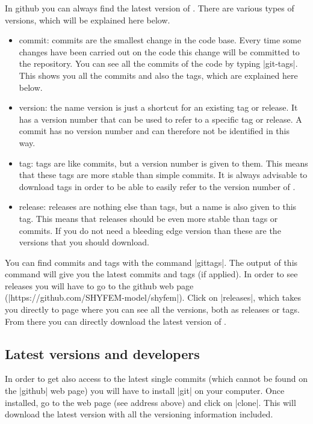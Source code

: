 In github you can always find the latest version of \shyfem{}. There
are various types of versions, which will be explained here below.

\begin{itemize}

\item commit: commits are the smallest change in the code base. Every time
some changes have been carried out on the code this change will be
committed to the repository. You can see all the commits of the code
by typing |git-tags|. This shows you all the commits and also the tags,
which are explained here below.

\item version: the name version is just a shortcut for an existing tag
or release. It has a version number that can be used to refer to a
specific tag or release. A commit has no version number and can therefore not
be identified in this way.

\item tag: tags are like commits, but a version number is given to
them. This means that these tags are more stable than simple commits. It
is always advisable to download tags in order to be able to easily refer
to the version number of \shyfem{}.

\item release: releases are nothing else than tags, but a name is also
given to this tag. This means that releases should be even more stable
than tags or commits. If you do not need a bleeding edge version than
these are the versions that you should download.

\end{itemize}

You can find commits and tags with the command |gittags|. The output of
this command will give you the latest commits and tags (if applied). In
order to see releases you will have to go to the github web page
(|https://github.com/SHYFEM-model/shyfem|). Click on |releases|, which
takes you directly to page where you can see all the versions, both
as releases or tags. From there you can directly download the latest
version of \shyfem{}.

\subsection{Latest versions and developers}

In order to get also access to the latest single commits (which cannot
be found on the |github| web page) you will have to install |git| on
your computer. Once installed, go to the web page (see address above)
and click on |clone|. This will download the latest version with all
the versioning information included.

